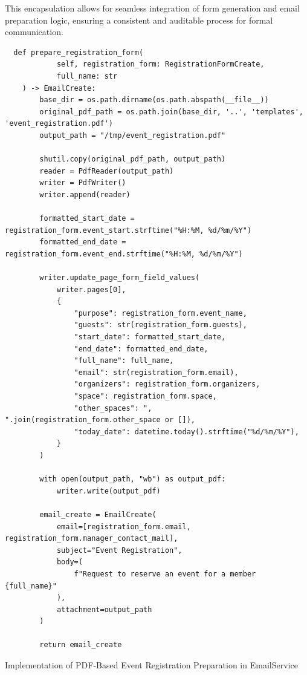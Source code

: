 This encapsulation allows for seamless integration of form generation and email preparation logic, ensuring a consistent and auditable process for formal communication. 

\begin{listing}
  \begin{verbatim}
  def prepare_registration_form(
            self, registration_form: RegistrationFormCreate,
            full_name: str
    ) -> EmailCreate:
        base_dir = os.path.dirname(os.path.abspath(__file__))
        original_pdf_path = os.path.join(base_dir, '..', 'templates', 'event_registration.pdf')
        output_path = "/tmp/event_registration.pdf"

        shutil.copy(original_pdf_path, output_path)
        reader = PdfReader(output_path)
        writer = PdfWriter()
        writer.append(reader)

        formatted_start_date = registration_form.event_start.strftime("%H:%M, %d/%m/%Y")
        formatted_end_date = registration_form.event_end.strftime("%H:%M, %d/%m/%Y")

        writer.update_page_form_field_values(
            writer.pages[0], 
            {
                "purpose": registration_form.event_name,
                "guests": str(registration_form.guests),
                "start_date": formatted_start_date,
                "end_date": formatted_end_date,
                "full_name": full_name,
                "email": str(registration_form.email),
                "organizers": registration_form.organizers,
                "space": registration_form.space,
                "other_spaces": ", ".join(registration_form.other_space or []),
                "today_date": datetime.today().strftime("%d/%m/%Y"),
            }
        )

        with open(output_path, "wb") as output_pdf:
            writer.write(output_pdf)

        email_create = EmailCreate(
            email=[registration_form.email, registration_form.manager_contact_mail],
            subject="Event Registration",
            body=(
                f"Request to reserve an event for a member {full_name}"
            ),
            attachment=output_path
        )

        return email_create
  \end{verbatim}
  \caption{Implementation of PDF-Based Event Registration Preparation in EmailService}
  \label{list:prepare-registration-form}
  \end{listing}

